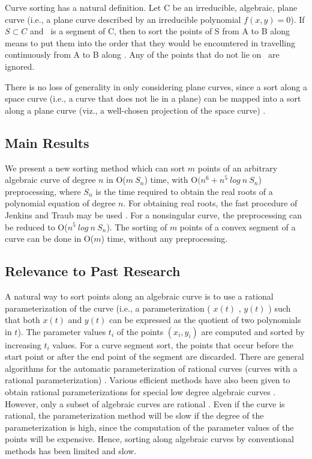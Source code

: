 Curve sorting has a natural definition.
Let C be an irreducible, algebraic, plane curve (i.e., 
a plane curve described by an irreducible polynomial \mbox{$f(x,y)=0$}).
If $S \subset C$ and \ is a segment of C,
then to sort the points of S from A to B along  means to put 
them into the order that they would be encountered in travelling 
continuously from A to B along .
Any of the points that do not lie on \ are ignored.

There is no loss of generality in only considering plane curves,
since a sort along a space curve
(i.e., a curve that does not lie in a plane)
can be mapped into a sort along a plane curve (viz., 
a well-chosen projection of the space curve) \cite{john}.
%
\subsection{Main Results}
%
\tab We present a new sorting method which can sort
$m$ points of an arbitrary algebraic curve of degree $n$ in O($m\ S_{n}$) time,
with O$(n^{6} +n^5\ log\ n\ S_{n}$) preprocessing, where $S_{n}$ is the time required to obtain the
real roots of a 
polynomial equation of degree $n$. For obtaining real roots, the fast procedure
of Jenkins and Traub may be used \cite{jen}.
For a nonsingular curve, the preprocessing can be reduced to 
O($n^5\ log\ n\ S_{n}$).
The sorting of $m$ points of a convex segment of a curve can be
done in O($m$) time, without any preprocessing.
%
\subsection{Relevance to Past Research}
\label{sec-1.3}

\tab A natural way to sort points along an algebraic curve is to use a rational parameterization
of the curve (i.e., a parameterization ( $x(t)$ , $y(t)$ ) such that both
$x(t)$ and $y(t)$ can be expressed as the quotient of two polynomials in $t$).
The parameter values $t_{i}$ of the points $(x_{i},y_{i})$ are computed and sorted by increasing $t_{i}$ values. For a curve segment sort, the points
that occur before the start point or after the end point of the segment
are discarded.
There are general algorithms for the 
automatic parameterization of rational curves (curves with a rational
parameterization) \cite{abba3}.
Various efficient methods have also been given to obtain rational
parameterizations for special low degree algebraic curves \cite{abba1,abba2,levi,ock}.
However, only a subset of algebraic curves are rational \cite{wa}.
Even if the curve is rational, the parameterization method will be slow
if the degree of the parameterization is high, since the computation
of the parameter values of the points will be expensive.
Hence, sorting along algebraic curves by conventional methods has been limited and slow.

